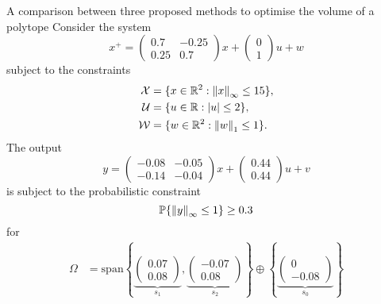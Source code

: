 \begin{example}{A comparison between three proposed methods to optimise the volume of a polytope}\label{example:MRPI:with:guarantees}
%
Consider the system
%
\begin{equation}\label{eq:example:system:MRPI}
	x^+ = \begin{pmatrix}0.7&-0.25\\0.25&0.7\end{pmatrix}x+\begin{pmatrix}0\\1\end{pmatrix}u+w
\end{equation}
%
subject to the constraints 
\begin{equation}\label{eq:example:rconstriaints}
\begin{aligned}
\mathcal X &= \{x\in\mathbb R^2 :\left\|x\right\|_\infty\leq15\}, \\
\mathcal U &= \{u\in\mathbb R :\left|u\right|\leq2\}, \\
\mathcal W &= \{w\in\mathbb R^2 :\left\|w\right\|_1\leq1\}.
\end{aligned}
\end{equation}
%
The output 
%
\begin{equation}
	y = \begin{pmatrix}-0.08&-0.05\\
   -0.14&   -0.04\end{pmatrix}x + \begin{pmatrix}
0.44\\0.44\end{pmatrix}u + v
\end{equation}
%
is subject to the probabilistic constraint
%
\begin{equation}\label{eq:example:pconstriaint}
	\mathbb P\{\left\|y\right\|_\infty\leq 1\}\geq 0.3
\end{equation}
%
for 
%
\begin{equation}\begin{aligned}
\Omega &= \text{span}\left\{\underbrace{\begin{pmatrix} 0.07 \\ 0.08\end{pmatrix}}_{s_1},\underbrace{\begin{pmatrix}-0.07 \\ 0.08\end{pmatrix}}_{s_2}\right\}\oplus\left\{\underbrace{\begin{pmatrix}0\\-0.08\end{pmatrix}}_{s_0}\right\}\\

\end{aligned}
\end{equation}
\end{example}
